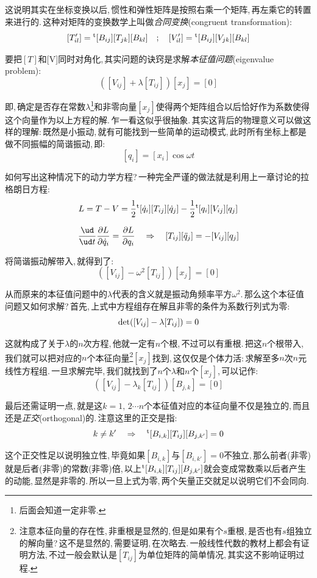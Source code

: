 这说明其实在坐标变换以后,\,惯性和弹性矩阵是按照右乘一个矩阵,\,再左乘它的转置来进行的.\,这种对矩阵的变换数学上叫做\emph{合同变换}(congruent transformation):
\[[T'_{il}]=\phantom{}^{\rm t}[B_{ij}][T_{jk}][B_{kl}]\quad ;\quad [V'_{il}] =\phantom{}^{\rm t}[B_{ij}][V_{jk}][B_{kl}]\]

要把$[T]$和[V]同时对角化,\,其实问题的诀窍是求解\emph{本征值问题}(eigenvalue problem):
\[([V_{ij}]+\lambda [T_{ij}])[x_j]=[0]\]

即,\,确定是否存在常数$\lambda$\footnote{后面会知道一定非零.}和非零向量$[x_j]$使得两个矩阵组合以后恰好作为系数使得这个向量作为以上方程的解.\,乍一看这似乎很抽象.\,其实这背后的物理意义可以做这样的理解:\,既然是小振动,\,就有可能找到一些简单的运动模式,\,此时所有坐标上都是做不同振幅的简谐振动,\,即:
\[[q_i]=[x_i]\cos\omega t\]




如何写出这种情况下的动力学方程?\,一种完全严谨的做法就是利用上一章讨论的拉格朗日方程:
\[L=T-V=\frac{1}{2}\phantom{}^{\rm t}[\dot{q}_i][T_{ij}][\dot{q}_j]-\frac{1}{2}\phantom{}^{\rm t}[q_i][V_{ij}][q_j]\]

\[\frac{\ud }{\ud t}\frac{\partial L}{\partial \dot{q}_i}=\frac{\partial L}{\partial {q}_i}\quad\Rightarrow \quad [T_{ij}][\ddot{q}_j]=-[V_{ij}][q_j]\]

将简谐振动解带入,\,就得到了:
\[([V_{ij}]-\omega^2 [T_{ij}])[x_j]=[0]\]

从而原来的本征值问题中的$\lambda$代表的含义就是振动角频率平方$\omega^2$.\,那么这个本征值问题又如何求解?\,首先,\,上式中方程组存在解且非零的条件为系数行列式为零:
\[{\rm det}([V_{ij}]-\lambda [T_{ij}])=0\]

这就构成了关于$\lambda$的$n$次方程,\,他就一定有$n$个根,\,不过可以有重根.\,把这$n$个根带入,\,我们就可以把对应的$n$个本征向量\footnote{注意本征向量的存在性,\,非重根是显然的,\,但是如果有个$s$重根,\,是否也有$s$组独立的解向量?\,这不是显然的,\,需要证明,\,在次略去.\,一般线性代数的教材上都会有证明方法,\,不过一般会默认是$[T_{ij}]$为单位矩阵的简单情况,\,其实这不影响证明过程.}$[x_j]$找到,\,这仅仅是个体力活:\,求解至多$n$次$n$元线性方程组.\,一旦求解完毕,\,我们就找到了$n$个$\lambda$和$n$个$[x_j]$,\,可以记作:
\[([V_{ij}]-\lambda_k [T_{ij}])[B_{j,k}]=[0]\]

最后还需证明一点,\,就是这$k=1,\,2\cdots n$个本征值对应的本征向量不仅是独立的,\,而且还是\emph{正交}(orthogonal)的.\,注意这里的正交是指:
\[k\neq k'\quad\Rightarrow\quad\phantom{}^{\rm t}[B_{i,k}][T_{ij}][B_{j,k'}]=0\]

这个正交性足以说明独立性,\,毕竟如果$[B_{i,k}]$与$[B_{i,k'}]=0$不独立,\,那么前者(非零)就是后者(非零)的常数(非零)倍,\,以上$\phantom{}^{\rm t}[B_{i,k}][T_{ij}][B_{j,k'}]$就会变成常数乘以后者产生的动能,\,显然是非零的.\,所以一旦上式为零,\,两个矢量正交就足以说明它们不会同向.

